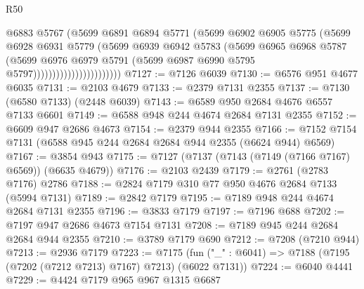 \begin{lexlean}{R50}
\begin{coremodule}
                                    @6883
                                    @5767
                                    (@5699
                                      @6891
                                      @6894
                                      @5771
                                      (@5699
                                        @6902
                                        @6905
                                        @5775
                                        (@5699
                                          @6928
                                          @6931
                                          @5779
                                          (@5699
                                            @6939
                                            @6942
                                            @5783
                                            (@5699
                                              @6965
                                              @6968
                                              @5787
                                              (@5699
                                                @6976
                                                @6979
                                                @5791
                                                (@5699
                                                  @6987
                                                  @6990
                                                  @5795
                                                  @5797)))))))))))))))))))))))
@7127 := @7126 @6039
@7130 := @6576 @951 @4677 @6035
@7131 := @2103 @4679
@7133 := @2379 @7131 @2355
@7137 := @7130 (@6580 @7133) (@2448 @6039)
@7143 := @6589 @950 @2684 @4676 @6557 @7133 @6601
@7149 := @6588 @948 @244 @4674 @2684 @7131 @2355
@7152 := @6609 @947 @2686 @4673
@7154 := @2379 @944 @2355
@7166 := @7152 @7154 @7131 (@6588 @945 @244 @2684 @2684 @944 @2355 (@6624 @944) @6569)
@7167 := @3854 @943
@7175 := @7127 (@7137 (@7143 (@7149 (@7166 @7167) @6569)) (@6635 @4679))
@7176 := @2103 @2439
@7179 := @2761 (@2783 @7176) @2786
@7188 := @2824 @7179 @310 @77 @950 @4676 @2684 @7133 (@5994 @7131)
@7189 := @2842 @7179
@7195 := @7189 @948 @244 @4674 @2684 @7131 @2355
@7196 := @3833 @7179
@7197 := @7196 @688
@7202 := @7197 @947 @2686 @4673 @7154 @7131
@7208 := @7189 @945 @244 @2684 @2684 @944 @2355
@7210 := @3789 @7179 @690
@7212 := @7208 (@7210 @944)
@7213 := @2936 @7179
@7223 := @7175 (fun ("_" : @6041) => @7188 (@7195 (@7202 (@7212 @7213) @7167) @7213) (@6022 @7131))
@7224 := @6040 @4441
@7229 := @4424 @7179 @965 @967 @1315 @6687

\end{coremodule}
\end{lexlean}
